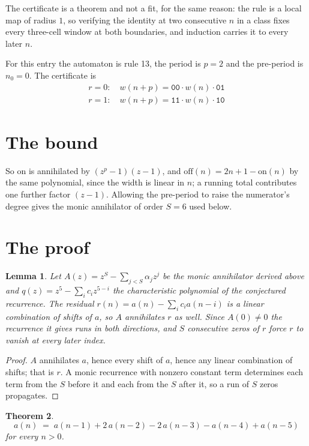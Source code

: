 \documentclass[11pt,a4paper]{article}
\theoremstyle{plain}
\newtheorem{theorem}{Theorem}
\newtheorem{lemma}[theorem]{Lemma}
\theoremstyle{definition}
\begin{document}
The certificate is a theorem and not a fit, for the same reason: the rule is a local map of
radius $1$, so verifying the identity at two consecutive $n$ in a class fixes every three-cell
window at both boundaries, and induction carries it to every later $n$.

For this entry the automaton is rule 13, the period is $p=2$ and the pre-period is $n_0=0$.
The certificate is
\begin{gather*}
r=0:\quad w(n+p) = \texttt{00} \cdot w(n) \cdot \texttt{01} \\
r=1:\quad w(n+p) = \texttt{11} \cdot w(n) \cdot \texttt{10}
\end{gather*}

\section{The bound}

So
$\mathrm{on}$ is annihilated by $(z^p-1)(z-1)$, and $\mathrm{off}(n)=2n+1-\mathrm{on}(n)$ by
the same polynomial, since the width is linear in $n$; a running total contributes one further
factor $(z-1)$. Allowing the pre-period to raise the numerator's degree gives the monic
annihilator of order $S=6$ used below.

\section{The proof}

\begin{lemma}\label{lem:crit}
Let $A(z)=z^S-\sum_{j<S}\alpha_jz^{j}$ be the monic annihilator derived above and
$q(z)=z^{5}-\sum_ic_iz^{5-i}$ the characteristic polynomial of the conjectured
recurrence. The residual $r(n)=a(n)-\sum_ic_ia(n-i)$ is a linear combination of shifts of $a$,
so $A$ annihilates $r$ as well. Since $A(0)\ne0$ the recurrence it gives runs in both
directions, and $S$ consecutive zeros of $r$ force $r$ to vanish at every later index.
\end{lemma}

\begin{proof}
$A$ annihilates $a$, hence every shift of $a$, hence any linear combination of shifts; that is
$r$. A monic recurrence with nonzero constant term determines each term from the $S$ before it
and each from the $S$ after it, so a run of $S$ zeros propagates.
\end{proof}

\begin{theorem}
\[
a(n)\;=\;a(n-1) + 2\,a(n-2) - 2\,a(n-3) - a(n-4) + a(n-5)
\]
for every $n>0$.
\end{theorem}
\end{document}
